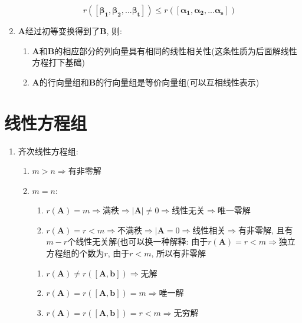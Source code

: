 \begin{enumerate}
\begin{equation*}
r([\bm{\beta_{1}},\bm{\beta_{2}},...\bm{\beta_{t}}])\le r([\bm{\alpha_{1}},\bm{\alpha_{2}},...\bm{\alpha_{s}}])
\end{equation*}
\item $\bm{A}$经过初等变换得到了$\bm{B}$, 则:
\begin{enumerate}
\item $\bm{A}$和$\bm{B}$的相应部分的列向量具有相同的线性相关性(这条性质为后面解线性方程打下基础)
\item $\bm{A}$的行向量组和$\bm{B}$的行向量组是等价向量组(可以互相线性表示)
\end{enumerate}
\end{enumerate}
\chapter{线性方程组}
\begin{enumerate}
\item 齐次线性方程组:
\begin{enumerate}
\item $m>n\Rightarrow $有非零解
\item $m=n$:
\begin{enumerate}
\item $r(\bm{A})=m\Rightarrow$满秩$\Rightarrow |\bm{A}|\neq 0 \Rightarrow$线性无关$\Rightarrow$唯一零解
\item $r(\bm{A})=r<m\Rightarrow$不满秩$\Rightarrow |\bm{A}=0\Rightarrow$线性相关$\Rightarrow$有非零解, 且有$m-r$个线性无关解(也可以换一种解释: 由于$r(\bm{A})=r<m\Rightarrow$独立方程组的个数为$r$, 由于$r<m$, 所以有非零解
\end{enumerate}
\begin{enumerate}
\item $r(\bm{A})\neq r([\bm{A},\bm{b}])\Rightarrow$无解
\item $r(\bm{A})=r([\bm{A},\bm{b}])=m\Rightarrow$唯一解
\item $r(\bm{A})=r([\bm{A},\bm{b}])=r<m\Rightarrow$无穷解
\end{enumerate}
\end{enumerate}
\end{enumerate}
